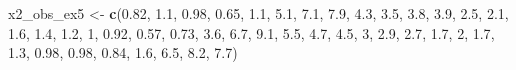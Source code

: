 \documentclass[
]{article}
\newenvironment{Shaded}{\begin{snugshade}}{\end{snugshade}}
\newcommand{\DecValTok}[1]{\textcolor[rgb]{0.00,0.00,0.81}{#1}}
\newcommand{\FloatTok}[1]{\textcolor[rgb]{0.00,0.00,0.81}{#1}}
\newcommand{\FunctionTok}[1]{\textcolor[rgb]{0.13,0.29,0.53}{\textbf{#1}}}
\newcommand{\NormalTok}[1]{#1}
\newcommand{\OtherTok}[1]{\textcolor[rgb]{0.56,0.35,0.01}{#1}}
\begin{document}
\begin{Shaded}
\begin{Highlighting}[]
\NormalTok{x2\_obs\_ex5 }\OtherTok{\textless{}{-}} \FunctionTok{c}\NormalTok{(}\FloatTok{0.82}\NormalTok{, }\FloatTok{1.1}\NormalTok{, }\FloatTok{0.98}\NormalTok{, }\FloatTok{0.65}\NormalTok{, }\FloatTok{1.1}\NormalTok{, }\FloatTok{5.1}\NormalTok{, }\FloatTok{7.1}\NormalTok{, }\FloatTok{7.9}\NormalTok{, }\FloatTok{4.3}\NormalTok{,}
    \FloatTok{3.5}\NormalTok{, }\FloatTok{3.8}\NormalTok{, }\FloatTok{3.9}\NormalTok{, }\FloatTok{2.5}\NormalTok{, }\FloatTok{2.1}\NormalTok{, }\FloatTok{1.6}\NormalTok{, }\FloatTok{1.4}\NormalTok{, }\FloatTok{1.2}\NormalTok{, }\DecValTok{1}\NormalTok{, }\FloatTok{0.92}\NormalTok{, }\FloatTok{0.57}\NormalTok{, }\FloatTok{0.73}\NormalTok{,}
    \FloatTok{3.6}\NormalTok{, }\FloatTok{6.7}\NormalTok{, }\FloatTok{9.1}\NormalTok{, }\FloatTok{5.5}\NormalTok{, }\FloatTok{4.7}\NormalTok{, }\FloatTok{4.5}\NormalTok{, }\DecValTok{3}\NormalTok{, }\FloatTok{2.9}\NormalTok{, }\FloatTok{2.7}\NormalTok{, }\FloatTok{1.7}\NormalTok{, }\DecValTok{2}\NormalTok{, }\FloatTok{1.7}\NormalTok{, }\FloatTok{1.3}\NormalTok{,}
    \FloatTok{0.98}\NormalTok{, }\FloatTok{0.98}\NormalTok{, }\FloatTok{0.84}\NormalTok{, }\FloatTok{1.6}\NormalTok{, }\FloatTok{6.5}\NormalTok{, }\FloatTok{8.2}\NormalTok{, }\FloatTok{7.7}\NormalTok{)}
\end{Highlighting}
\end{Shaded}
\end{document}

